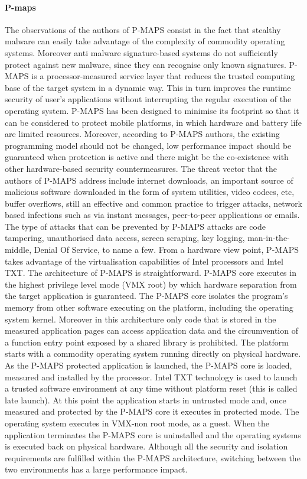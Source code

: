 \paragraph{P-maps}
The observations of the authors of P-MAPS \cite{pmaps} consist in the fact that stealthy malware can easily take advantage of the complexity of commodity operating systems. Moreover anti malware signature-based systems do not sufficiently protect against new malware, since they can recognise only known signatures. P-MAPS is a processor-measured service layer that reduces the trusted computing base of the target system in a dynamic way. This in turn improves the runtime security of user's applications without interrupting the regular execution of the operating system. P-MAPS has been designed to minimise its footprint so that it can be considered to protect mobile platforms, in which hardware and battery life are limited resources.
Moreover, according to P-MAPS authors, the existing programming model should not be changed, low performance impact should be guaranteed when protection is active and there might be the co-existence with other hardware-based security countermeasures.
The threat vector that the authors of P-MAPS address include internet downloads, an important source of malicious software downloaded in the form of system utilities, video codecs, etc, buffer overflows, still an effective and common practice to trigger attacks, network based infections such as via instant messages, peer-to-peer applications or emails. The type of attacks that can be prevented by P-MAPS attacks are code tampering, unauthorised data access, screen scraping, key logging, man-in-the-middle, Denial Of Service, to name a few.
From a hardware view point, P-MAPS takes advantage of the virtualisation capabilities of Intel processors and Intel TXT.
The architecture of P-MAPS is straightforward. P-MAPS core executes in the highest privilege level mode (VMX root) by which hardware separation from the target application is guaranteed. The P-MAPS core isolates the program's memory from other software executing on the platform, including the operating system kernel. Moreover in this architecture only code that is stored in the measured application pages can access application data and the circumvention of a function entry point exposed by a shared library is prohibited. 
The platform starts with a commodity operating system running directly on physical hardware. As the P-MAPS protected application is launched, the P-MAPS core is loaded, measured and installed by the processor. Intel TXT technology is used to launch a trusted software environment at any time without platform reset (this is called late launch). At this point the application starts in untrusted mode and, once measured and protected by the P-MAPS core it executes in protected mode. The operating system executes in VMX-non root mode, as a guest. When the application terminates the P-MAPS core is uninstalled and the operating systems is executed back on physical hardware.
Although all the security and isolation requirements are fulfilled within the P-MAPS architecture, switching between the two environments has a large performance impact. 


